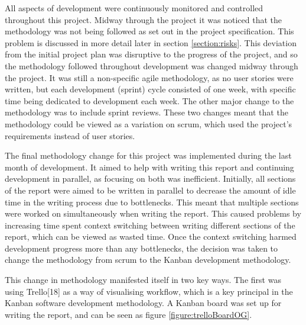 \documentclass{article}
\begin{document}
All aspects of development were continuously monitored and controlled throughout this project. Midway through the project it was noticed that the methodology was not being followed as set out in the project specification. This problem is discussed in more detail later in section \ref{section:risks}. This deviation from the initial project plan was disruptive to the progress of the project, and so the methodology followed throughout development was changed midway through the project. It was still a non-specific agile methodology, as no user stories were written, but each development (sprint) cycle consisted of one week, with specific time being dedicated to development each week. The other major change to the methodology was to include sprint reviews. These two changes meant that the methodology could be viewed as a variation on scrum, which used the project's requirements instead of user stories. \par

The final methodology change for this project was implemented during the last month of development. It aimed to help with writing this report and continuing development in parallel, as focusing on both was inefficient. Initially, all sections of the report were aimed to be written in parallel to decrease the amount of idle time in the writing process due to bottlenecks. This meant that multiple sections were worked on simultaneously when writing the report. This caused problems by increasing time spent context switching between writing different sections of the report, which can be viewed as wasted time. Once the context switching harmed development progress more than any bottlenecks, the decision was taken to change the methodology from scrum to the Kanban development methodology. \par

This change in methodology manifested itself in two key ways. The first was using Trello[18] as a way of visualising workflow, which is a key principal in the Kanban software development methodology. A Kanban board was set up for writing the report, and can be seen as figure \ref{figure:trelloBoardOG}. \par
\end{document}
